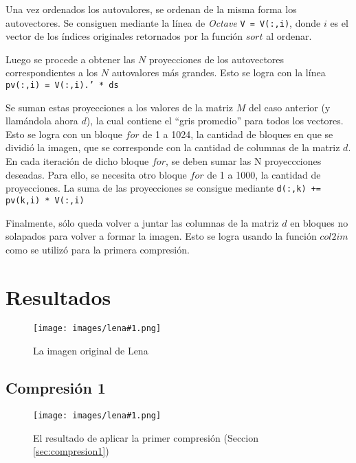 \documentclass[twocolumn,a4paper,10pt]{article}
\begin{document}
Una vez ordenados los autovalores, se ordenan de la misma forma los autovectores. Se consiguen mediante la línea de \textit{Octave} \texttt{V = V(:,i)}, 
donde $i$ es el vector de los índices originales retornados por la función $sort$ al ordenar.

Luego se procede a obtener las $N$ proyecciones de los autovectores correspondientes a los $N$ autovalores más grandes. Esto se logra con la línea 
\texttt{pv(:,i) = V(:,i).' * ds}

Se suman estas proyecciones a los valores de la matriz $M$ del caso anterior (y llam\'andola ahora $d$), la cual contiene el ``gris promedio'' para todos 
los vectores. Esto se logra con un bloque $for$ de 1 a 1024, la cantidad de bloques en que se dividió la imagen, que se corresponde con la cantidad de 
columnas de la matriz $d$. En cada iteración de dicho bloque $for$, se deben sumar las N proyeccciones deseadas. Para ello, se necesita otro bloque $for$
 de 1 a 1000, la cantidad de proyecciones. La suma de las proyecciones se consigue mediante \texttt{d(:,k)\: += pv(k,i) * V(:,i)}

Finalmente, s\'olo queda volver a juntar las columnas de la matriz $d$ en bloques no solapados para volver a formar la imagen. Esto se logra usando 
la funci\'on $col2im$ como se utilizó para la primera compresi\'on.  

\section{Resultados}
\label{sec:resultados}

\newcommand{\lena}[2]{
    \begin{figure}[H]
        \texttt{[image: images/lena\#1.png]}
        \caption{#2}
        \label{fig:lena#1}
    \end{figure}
}

\newcommand{\autoimage}[2]{
    \begin{figure}[H]
        \texttt{[image: images/autoimage\#1.png]}
        \caption{#2}
        \label{fig:lena#1}
    \end{figure}
}


\lena{512}{La imagen original de Lena}

\subsection{Compresi\'on 1}

\lena{-bruta}{El resultado de aplicar la primer compresi\'on (Seccion \ref{sec:compresion1})}
\end{document}
